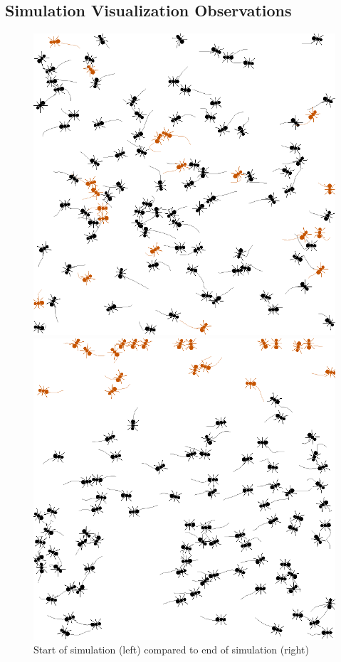 \documentclass[9pt]{IEEEtran}
\begin{document}
\subsection{Simulation Visualization Observations}

\begin{figure}[hbt]
    \centering
    \begin{minipage}{0.21\textwidth}
        \centering
        \includegraphics[width=.9\linewidth]{frame_25.png}
    \end{minipage}
    \hspace{0.2cm}
    \begin{minipage}{0.21\textwidth}
        \centering
        \includegraphics[width=.9\linewidth]{frame_1300.png}
    \end{minipage}
    \caption{Start of simulation (left) compared to end of simulation (right)}
    \label{fig:trained_viz}
\end{figure}
\end{document}
